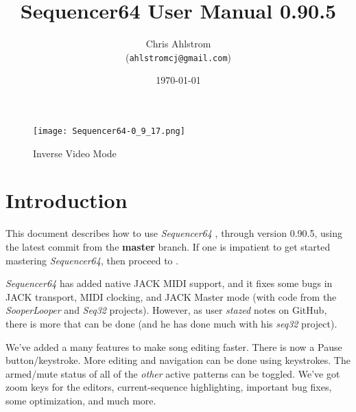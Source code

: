 \documentclass[
 11pt,
 twoside,
 a4paper,
 headinclude,
 footinclude,
 final                                 %
]{article}
\begin{document}
\title{Sequencer64 User Manual 0.90.5}
\author{Chris Ahlstrom \\
   (\texttt{ahlstromcj@gmail.com})}
\date{\today}
\maketitle

\begin{figure}[H]
   \centering 
   \texttt{[image: Sequencer64-0\_9\_17.png]}
   \caption*{Inverse Video Mode}
\end{figure}

\clearpage                             %

\tableofcontents
\listoffigures                         %
\listoftables                          %


\setlength{\parindent}{0pt}
\setlength{\parskip}{1ex plus 0.5ex minus 0.2ex}

\section{Introduction}
\label{sec:introduction}

   This document describes how to use \textsl{Sequencer64}
   \cite{sequencer64}, through version 0.90.5,
   using the latest commit from the \textbf{master} branch.
   If one is impatient to get started mastering \textsl{Sequencer64},
   then proceed to .

   \textsl{Sequencer64} has added native JACK MIDI support,
   and it fixes some bugs in JACK transport, MIDI clocking, and
   JACK Master mode (with code from the \textsl{SooperLooper} 
   and \textsl{Seq32} projects).
   However, as user \textsl{stazed} notes on GitHub, there is more that can be
   done (and he has done much with his \textsl{seq32} \cite{seq32} project).

   We've added a many features to make song editing faster.
   There is now a Pause button/keystroke.
   More editing and navigation can be done using keystrokes.
   The armed/mute status of all of the \textsl{other} active patterns can be
   toggled.
   We've got zoom keys for the editors, current-sequence highlighting,
   important bug fixes, some optimization, and much more.
\end{document}
